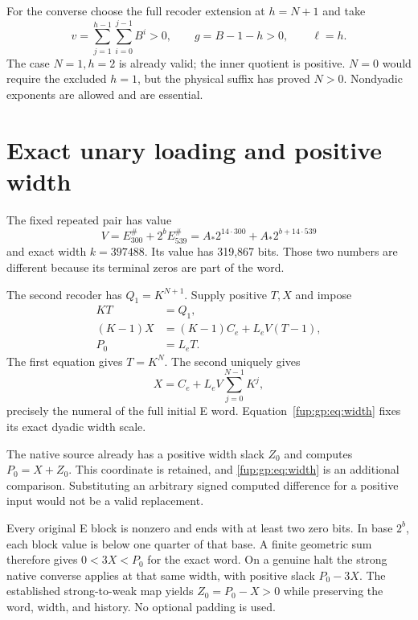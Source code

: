 \documentclass[11pt,letterpaper]{article}
\theoremstyle{definition}\newtheorem{definition}[theorem]{Definition}
\theoremstyle{remark}\newtheorem{remark}[theorem]{Remark}
\begin{document}
For the converse choose the full recoder extension at $h=N+1$ and take
\[
 v=\sum_{j=1}^{h-1}\sum_{i=0}^{j-1}B^i>0,
 \qquad g=B-1-h>0,\qquad\ell=h.
\]
The case $N=1,h=2$ is already valid; the inner quotient is positive. $N=0$ would require the excluded $h=1$, but the physical suffix has proved $N>0$. Nondyadic exponents are allowed and are essential.

\section{Exact unary loading and positive width}
The fixed repeated pair has value
\[
 V=E_{300}^\#+2^bE_{539}^\#
   =A_*2^{14\cdot300}+A_*2^{b+14\cdot539}
\]
and exact width $k=397488$. Its value has 319,867 bits. Those two numbers are different because its terminal zeros are part of the word.

The second recoder has $Q_1=K^{N+1}$. Supply positive $T,X$ and impose
\begin{align}
 KT&=Q_1,\label{fup:gp:eq:unary}\\
 (K-1)X&=(K-1)C_e+L_eV(T-1),\nonumber\\
 P_0&=L_eT.\label{fup:gp:eq:width}
\end{align}
The first equation gives $T=K^N$. The second uniquely gives
\[
 X=C_e+L_eV\sum_{j=0}^{N-1}K^j,
\]
precisely the numeral of the full initial E word. Equation~\eqref{fup:gp:eq:width} fixes its exact dyadic width scale.

The native source already has a positive width slack $Z_0$ and computes $P_0=X+Z_0$. This coordinate is retained, and \eqref{fup:gp:eq:width} is an additional comparison. Substituting an arbitrary signed computed difference for a positive input would not be a valid replacement.

Every original E block is nonzero and ends with at least two zero bits. In base $2^b$, each block value is below one quarter of that base. A finite geometric sum therefore gives $0<3X<P_0$ for the exact word. On a genuine halt the strong native converse applies at that same width, with positive slack $P_0-3X$. The established strong-to-weak map yields $Z_0=P_0-X>0$ while preserving the word, width, and history. No optional padding is used.
\end{document}

